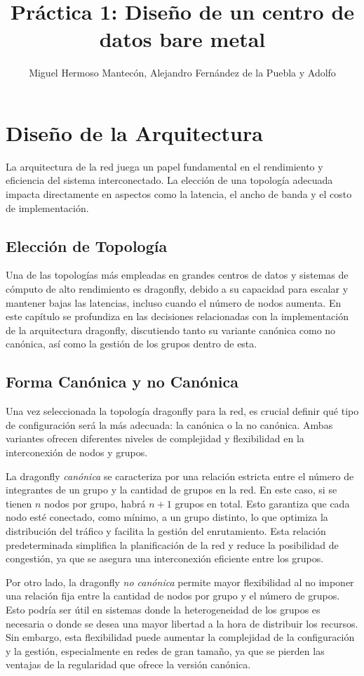 \documentclass[%
    school=etsisi,%
    degree=61TI,%
]{upm-report}
\title{Práctica 1: Diseño de un centro de datos bare metal}
\author{Miguel Hermoso Mantecón, Alejandro Fernández de la Puebla y Adolfo}
\begin{document}
\chapter{Diseño de la Arquitectura}
\label{ch:diseño-arquitectura}

La arquitectura de la red juega un papel fundamental en el rendimiento y eficiencia del sistema interconectado. La elección de una topología adecuada impacta directamente en aspectos como la latencia, el ancho de banda y el costo de implementación. 

\section{Elección de Topología}
\label{sec:elección-topología}

Una de las topologías más empleadas en grandes centros de datos y sistemas de cómputo de alto rendimiento es dragonfly, debido a su capacidad para escalar y mantener bajas las latencias, incluso cuando el número de nodos aumenta. En este capítulo se profundiza en las decisiones relacionadas con la implementación de la arquitectura dragonfly, discutiendo tanto su variante canónica como no canónica, así como la gestión de los grupos dentro de esta.

\section{Forma Canónica y no Canónica}
\label{sec:dragonfly}

Una vez seleccionada la topología dragonfly para la red, es crucial definir qué tipo de configuración será la más adecuada: la canónica o la no canónica. Ambas variantes ofrecen diferentes niveles de complejidad y flexibilidad en la interconexión de nodos y grupos.

La dragonfly \textit{canónica} se caracteriza por una relación estricta entre el número de integrantes de un grupo y la cantidad de grupos en la red. En este caso, si se tienen $n$ nodos por grupo, habrá $n+1$ grupos en total. Esto garantiza que cada nodo esté conectado, como mínimo, a un grupo distinto, lo que optimiza la distribución del tráfico y facilita la gestión del enrutamiento. Esta relación predeterminada simplifica la planificación de la red y reduce la posibilidad de congestión, ya que se asegura una interconexión eficiente entre los grupos.

Por otro lado, la dragonfly \textit{no canónica} permite mayor flexibilidad al no imponer una relación fija entre la cantidad de nodos por grupo y el número de grupos. Esto podría ser útil en sistemas donde la heterogeneidad de los grupos es necesaria o donde se desea una mayor libertad a la hora de distribuir los recursos. Sin embargo, esta flexibilidad puede aumentar la complejidad de la configuración y la gestión, especialmente en redes de gran tamaño, ya que se pierden las ventajas de la regularidad que ofrece la versión canónica.
\end{document}
